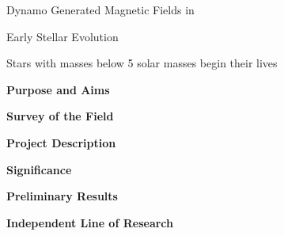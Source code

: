 \documentclass[12pt,a4paper]{article}
\begin{document}
\begin{center}
	{\bf {\LARGE Dynamo Generated Magnetic Fields in 
	
		  Early Stellar Evolution}}
\end{center}
\vspace{\baselineskip}

Stars with masses below 5 solar masses begin their lives

{\bf \large Purpose and Aims}

{\bf \large Survey of the Field}

{\bf \large Project Description}

{\bf \large Significance}

{\bf \large Preliminary Results}

{\bf \large Independent Line of Research}
\end{document}
